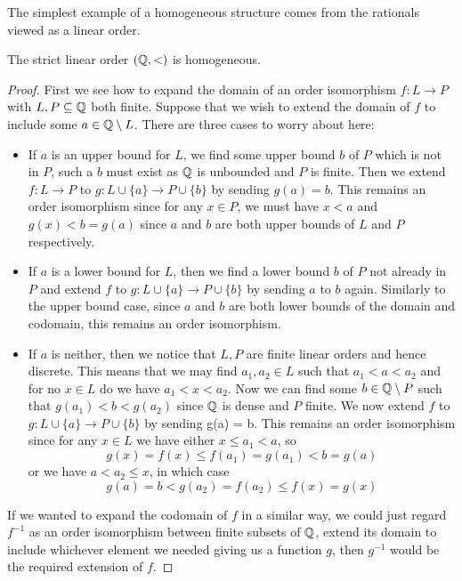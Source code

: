 The simplest example of a homogeneous structure comes from the rationals viewed as a linear
order.

\begin{prop}
  The strict linear order $(\mathbb{Q},<)$ is homogeneous.
\end{prop}
\begin{proof}
  First we see how to expand the
  domain of an order isomorphism $f : L \to P$ with $L, P \subseteq \mathbb{Q}$ both finite. Suppose that we
  wish to extend the domain of $f$ to include some $a \in \mathbb{Q} \setminus L$. There are three cases to
  worry about here:
  \begin{itemize}
    \item If $a$ is an upper bound for $L$, we find some upper bound $b$ of $P$ which is
      not in $P$, such a $b$ must exist as $\mathbb{Q}$ is unbounded and $P$ is finite. Then we extend
      $f : L \to P$ to $g : L \cup \{a\} \to P \cup \{b\}$ by sending $g(a) = b$. This remains an
      order isomorphism since for any $x \in P$, we must have $x < a$ and $g(x) < b = g(a)$ since
      $a$ and $b$ are both upper bounds of $L$ and $P$ respectively.
    \item If $a$ is a lower bound for $L$, then we find a lower bound $b$ of $P$ not already in
      $P$ and extend $f$ to $g : L \cup \{a\} \to P \cup \{b\}$ by sending $a$ to $b$ again.
      Similarly to the upper bound case, since $a$ and $b$ are both lower bounds of the domain and
      codomain, this remains an order isomorphism.
    \item If $a$ is neither, then we notice that $L,P$ are finite linear orders and hence discrete.
      This means that we may find $a_1,a_2 \in L$ such that $a_1 < a < a_2$ and for no $x \in L$ do
      we have $a_1 < x < a_2$. Now we can find some $b \in \mathbb{Q} \setminus P$ such that
      $g(a_1) < b < g(a_2)$ since $\mathbb{Q}$ is dense and $P$ finite. We now extend $f$ to
      $g : L \cup \{a\} \to P \cup \{b\}$ by sending g(a) = b. This remains an order isomorphism
      since for any $x \in L$ we have either $x \leq a_1 < a$, so
      \begin{equation*}
        g(x) = f(x) \leq f(a_1) = g(a_1) < b = g(a)
      \end{equation*}
      or we have $a < a_2 \leq x$, in which case
      \begin{equation*}
        g(a) = b < g(a_2) = f(a_2) \leq f(x) = g(x)
      \end{equation*}
  \end{itemize}
  If we wanted to expand the codomain of $f$ in a similar way, we could just regard $f^{-1}$ as
  an order isomorphism between finite subsets of $\mathbb{Q}$, extend its domain to include whichever
  element we needed giving us a function $g$, then $g^{-1}$ would be the required extension of $f$.


\end{proof}
